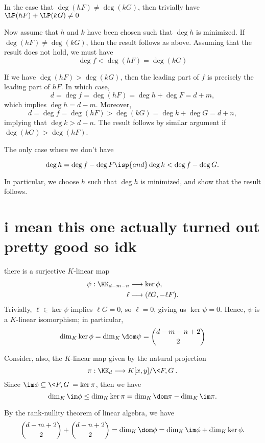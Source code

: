 \documentclass[12pt]{article}
\begin{document}
    In the case that $\deg(hF) \ne \deg(kG)$, then trivially have $\LP(hF) + \LP(kG) \ne 0$

    Now assume that $h$ and $k$ have been chosen such that $\deg h$ is minimized. If $\deg(hF) \ne \deg(kG)$, then the result follows as above.  Assuming that the result does not hold, we must have
    \[
        \deg f < \deg(hF) = \deg(kG)
    \]

    
    
    If we have $\deg(hF) > \deg(kG)$, then the leading part of $f$ is precisely the leading part of $hF$. In which case,
    \[
        d = \deg f = \deg(hF) = \deg h + \deg F = d + m,
    \]
    which implies $\deg h = d - m$. Moreover,
    \[
        d = \deg f = \deg(hF) > \deg(kG) = \deg k + \deg G = d + n,
    \]
    implying that $\deg k > d - n$. The result follows by similar argument if $\deg(kG) > \deg(hF)$.

    The only case where we don't have 

    \[
        \deg h = \deg f - \deg F \isp{and} \deg k < \deg f - \deg G.
    \]

    In particular, we choose $h$ such that $\deg h$ is minimized, and show that the result follows. 


\section{i mean this one actually turned out pretty good so idk}

there is a surjective $K$-linear map
    \begin{align*}
        \psi : \KK_{d - m - n} &\longrightarrow \ker \phi, \\
        \ell &\longmapsto (\ell G, -\ell F).
    \end{align*}
    Trivially, $\ell \in \ker \psi$ implies $\ell G = 0$, so $\ell = 0$, giving us $\ker \psi = 0$. Hence, $\psi$ is a $K$-linear isomorphism; in particular,
    \[
        \dim_K \ker \phi
            = \dim_K \dom \psi
            = \binom{d-m-n+2}{2}
    \]

    Consider, also, the $K$-linear map given by the natural projection
    \[
        \pi : \KK_d \longrightarrow K[x, y] / \<F, G\>.
    \]
    Since $\im \phi \subseteq \<F, G\> = \ker \pi$, then we have
    \[
        \dim_K \im \phi \leq \dim_K \ker \pi = \dim_K \dom \pi - \dim_K \im \pi.
    \]

    By the rank-nullity theorem of linear algebra, we have
    \[
        \binom{d-m+2}{2} + \binom{d-n+2}{2} = \dim_K \dom \phi = \dim_K \im \phi + \dim_K \ker \phi.
    \]
\end{document}
